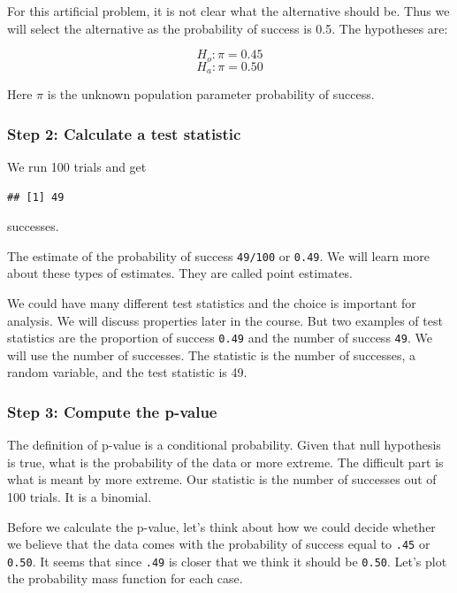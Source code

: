 \documentclass[]{book}
\theoremstyle{definition}
\theoremstyle{definition}
\theoremstyle{definition}
\theoremstyle{remark}
\begin{document}
For this artificial problem, it is not clear what the alternative should
be. Thus we will select the alternative as the probability of success is
0.5. The hypotheses are:

\[H_{o}: \pi = 0.45 \] \[H_{a}: \pi = 0.50 \]

Here \(\pi\) is the unknown population parameter probability of success.

\subsubsection{Step 2: Calculate a test
statistic}\label{step-2-calculate-a-test-statistic}

We run 100 trials and get

\begin{verbatim}
## [1] 49
\end{verbatim}

successes.

The estimate of the probability of success \texttt{49/100} or
\texttt{0.49}. We will learn more about these types of estimates. They
are called point estimates.

We could have many different test statistics and the choice is important
for analysis. We will discuss properties later in the course. But two
examples of test statistics are the proportion of success \texttt{0.49}
and the number of success \texttt{49}. We will use the number of
successes. The statistic is the number of successes, a random variable,
and the test statistic is 49.

\subsubsection{Step 3: Compute the
p-value}\label{step-3-compute-the-p-value}

The definition of p-value is a conditional probability. Given that null
hypothesis is true, what is the probability of the data or more extreme.
The difficult part is what is meant by more extreme. Our statistic is
the number of successes out of 100 trials. It is a binomial.

Before we calculate the p-value, let's think about how we could decide
whether we believe that the data comes with the probability of success
equal to \texttt{.45} or \texttt{0.50}. It seems that since \texttt{.49}
is closer that we think it should be \texttt{0.50}. Let's plot the
probability mass function for each case.
\end{document}
